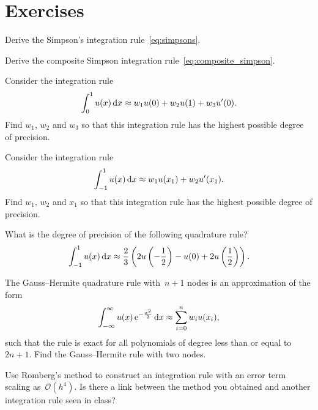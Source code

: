 \section{Exercises}
\begin{exercise}
    Derive the Simpson's integration rule~\eqref{eq:simpsons}.
\end{exercise}

\begin{exercise}
    \label{exercise:composite_simpson}
    Derive the composite Simpson integration rule~\eqref{eq:composite_simpson}.
\end{exercise}

\begin{exercise}
    Consider the integration rule
    \[
        \int_{0}^{1} u(x) \, \mathrm d x \approx w_1 u(0) + w_2 u(1) + w_3 u'(0).
    \]
    Find $w_1$, $w_2$ and $w_3$ so that this integration rule has the highest possible degree of precision.
\end{exercise}

\begin{exercise}
    Consider the integration rule
    \[
        \int_{-1}^{1} u(x) \, \mathrm d x \approx w_1 u(x_1) + w_2 u'(x_1).
    \]
    Find $w_1$, $w_2$ and $x_1$ so that this integration rule has the highest possible degree of precision.
\end{exercise}

\begin{exercise}
    What is the degree of precision of the following quadrature rule?
    \[
        \int_{-1}^{1} u(x) \, \mathrm d x \approx \frac{2}{3}  \left( 2 u\left(-\frac{1}{2}\right) - u(0) + 2 u\left(\frac{1}{2}\right) \right).
    \]
\end{exercise}

\begin{exercise}
    The Gauss--Hermite quadrature rule with~$n+1$ nodes is an approximation of the form
    \[
        \int_{-\infty}^{\infty} u(x) \, \mathrm e^{- \frac{x^2}{2}} \, \mathrm d x \approx \sum_{i=0}^{n} w_i u(x_i),
    \]
    such that the rule is exact for all polynomials of degree less than or equal to $2n+1$.
    Find the Gauss--Hermite rule with two nodes.
\end{exercise}

\begin{exercise}
    Use Romberg's method to construct an integration rule with an error term scaling as~$\mathcal O(h^4)$.
    Is there a link between the method you obtained and another integration rule seen in class?
\end{exercise}

